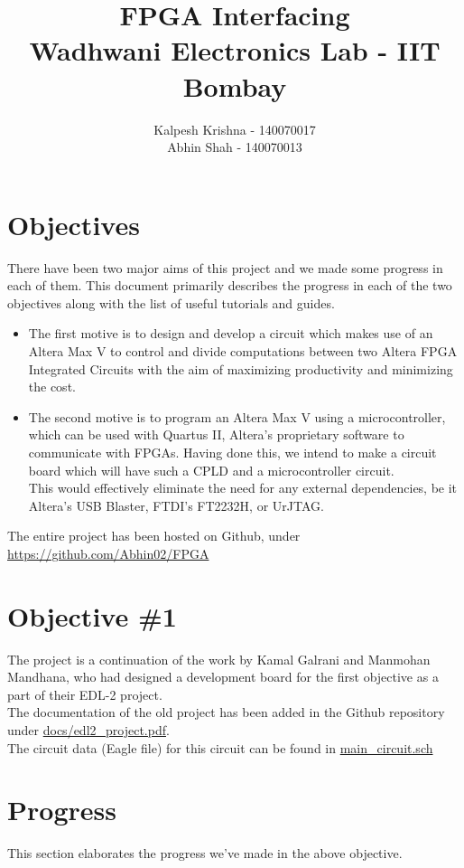 \documentclass[11pt]{article}
\title{\textbf{FPGA Interfacing}\\Wadhwani Electronics Lab - IIT Bombay}
\author{Kalpesh Krishna - 140070017\\
		Abhin Shah - 140070013}
\date{}
\begin{document}
\maketitle

\section*{Objectives}
There have been two major aims of this project and we made some progress in each of them. This document primarily describes the progress in each of the two objectives along with the list of useful tutorials and guides.

\begin{itemize}
\item The first motive is to design and develop a circuit which makes use of an Altera Max V to control and divide computations between two Altera FPGA Integrated Circuits with the aim of maximizing productivity and minimizing the cost.
\item The second motive is to program an Altera Max V using a microcontroller, which can be used with Quartus II, Altera's proprietary software to communicate with FPGAs. Having done this, we intend to make a circuit board which will have such a CPLD and a microcontroller circuit.\\
 This would effectively eliminate the need for any external dependencies, be it Altera's USB Blaster, FTDI's FT2232H, or UrJTAG.
\end{itemize}
The entire project has been hosted on Github, under \href{https://github.com/Abhin02/FPGA}{https://github.com/Abhin02/FPGA}
\pagebreak
\section*{Objective \#1}

The project is a continuation of the work by Kamal Galrani and Manmohan Mandhana, who had designed a development board for the first objective as a part of their EDL-2 project.\\ The documentation of the old project has been added in the Github repository under \href{https://github.com/Abhin02/FPGA/tree/master/docs/edl2_project.pdf}{docs/edl2\_project.pdf}.\\
The circuit data (Eagle file) for this circuit can be found in \href{https://github.com/Abhin02/FPGA/blob/master/eagle/main_circuit.sch}{main\_circuit.sch}

\section*{Progress}
This section elaborates the progress we've made in the above objective.
\end{document}
